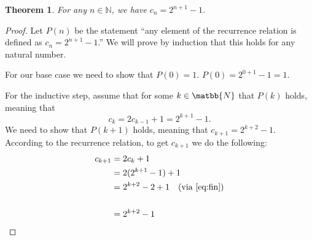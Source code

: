 \documentclass[10pt,letter]{article}
\newtheorem*{thm}{Theorem}
\begin{document}
\begin{thm}
  For any $n \in \mathbb{N}$, we have $c_n = 2^{n+1} - 1$.
\end{thm}
\begin{proof}
  Let $P(n)$ be the statement ``any element of the recurrence relation is defined as $c_n = 2^{n+1} - 1$.'' We will prove by induction that this holds for any natural number.
  
  For our base case we need to show that $P(0) = 1$. $P(0) = 2^{0 + 1} - 1 = 1$. 

  For the inductive step, assume that for some $k \in \matbb{N}$ that $P(k)$ holds, meaning that
  \begin{equation} \label{eq:fin}
    c_{k} = 2c_{k-1} + 1 = 2^{k+1} - 1.
  \end{equation}
  We need to show that $P(k+1)$ holds, meaning that $c_{k+1} = 2^{k+2} - 1$. According to the recurrence relation, to get $c_{k+1}$ we do the following:
  \begin{align*}
    c_{k+1} &= 2c_k + 1 \\
            &= 2(2^{k+1} - 1) + 1 \\
            &= 2^{k+2} - 2 + 1\quad (\text{via } \ref{eq:fin})\\\\
            &= 2^{k+2} - 1
  \end{align*}
\end{proof}


\end{document}
